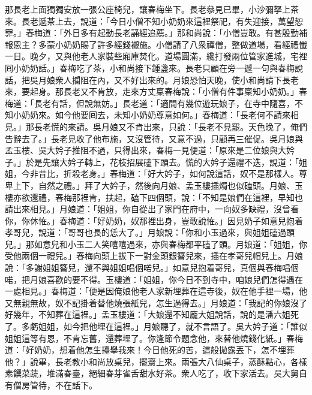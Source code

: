 那長老上面獨獨安放一張公座椅兒，讓春梅坐下。長老叅見已畢，小沙彌拏上茶來。長老遞茶上去，說道：「今日小僧不知小奶奶來這裡祭祀，有失迎接，萬望恕罪。」春梅道：「外日多有起動長老誦經追薦。」那和尚說：「小僧豈敢。有甚殷勤補報恩主？多蒙小奶奶賜了許多經錢襯施。小僧請了八衆禪僧，整做道場，看經禮懺一日。晚夕，又與他老人家裝些廂庫焚化。道場圓滿，纔打發兩位管家進城，宅裡囘小奶奶話。」春梅吃了茶，小和尚接下鍾盞來。長老只顧在旁一遞一句與春梅說話，把吳月娘衆人攔阻在內，又不好出來的。月娘恐怕天晚，使小和尚請下長老來，要起身。那長老又不肯放，走來方丈稟春梅說：「小僧有件事稟知小奶奶。」春梅道：「長老有話，但說無妨。」長老道：「適間有幾位遊玩娘子，在寺中隨喜，不知小奶奶來。如今他要囘去，未知小奶奶尊意如何。」春梅道：「長老何不請來相見。」那長老慌的來請。吳月娘又不肯出來，只說：「長老不見罷。天色晚了，俺們告辭去了。」{}長老見收了他布施，又沒管待，又意不過，只顧再三催促。吳月娘與孟玉樓、吳大妗子推阻不過，只得出來，春梅一見便道：「原來是二位娘與大妗子。」於是先讓大妗子轉上，花枝招展磕下頭去。慌的大妗子還禮不迭，說道：「姐姐，今非昔比，折殺老身。」春梅道：「好大妗子，如何說這話，奴不是那樣人。{}尊卑上下，自然之禮。」拜了大妗子，然後向月娘、孟玉樓插燭也似磕頭。月娘、玉樓亦欲還禮，春梅那裡肯，扶起，磕下四個頭，說：「不知是娘們在這裡，早知也請出來相見。」月娘道：「姐姐，你自從出了家門在府中，一向奴多缺禮，沒曾看你，你休恠。」{}春梅道：「好奶奶，奴那裡出身，豈敢說恠。」{}因見奶子如意兒抱着孝哥兒，說道：「哥哥也長的恁大了。」月娘說：「你和小玉過來，與姐姐磕過頭兒。」那如意兒和小玉二人笑嘻嘻過來，亦與春梅都平磕了頭。月娘道：「姐姐，你受他兩個一禮兒。」春梅向頭上拔下一對金頭銀簪兒來，插在孝哥兒帽兒上。月娘說：「多謝姐姐簪兒，還不與姐姐唱個喏兒。」如意兒抱着哥兒，真個與春梅唱個喏，把月娘喜歡的要不得。玉樓道：「姐姐，你今日不到寺中，咱娘兒們怎得遇在一處相見。」春梅道：「便是因俺娘他老人家新埋葬在這寺後，奴在他手裡一場，他又無親無故，奴不記掛着替他燒張紙兒，怎生過得去。」月娘道：「我記的你娘沒了好幾年，不知葬在這裡。」{}孟玉樓道：「大娘還不知龐大姐說話，說的是潘六姐死了。多虧姐姐，如今把他埋在這裡。」月娘聽了，就不言語了。吳大妗子道：「誰似姐姐這等有恩，不肯忘舊，還葬埋了。{}你逢節令題念他，來替他燒錢化紙。」春梅道：「好奶奶，想着他怎生擡舉我來！今日他死的苦，這般拋露丟下，怎不埋葬他？」{}說畢，長老教小和尚放桌兒，擺齋上來。兩張大八仙桌子，蒸酥點心，各樣素饌菜蔬，堆滿春臺，絕細春芽雀舌甜水好茶。衆人吃了，收下家活去。吳大舅自有僧房管待，不在話下。

